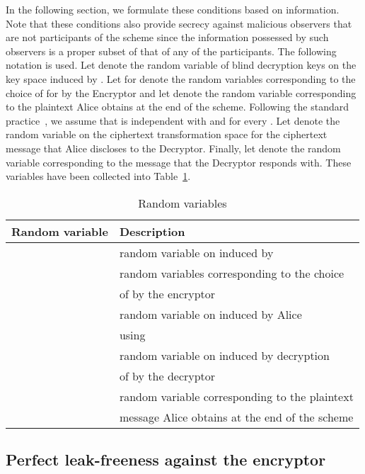 \documentclass[10pt,journal]{IEEEtran}
\begin{document}
In the following section, we formulate these conditions based on information. Note that these
conditions also provide secrecy against malicious observers that are not participants of the
scheme since the information possessed by such observers is a proper subset of that of any of the participants.
The following
notation is used.
Let 
denote the random variable of blind decryption keys on the key space 
induced by .
Let  for  denote
the random variables corresponding to the choice of  for 
by the Encryptor and let  denote the random variable corresponding to the plaintext 
Alice obtains at the end of the scheme. Following the standard practice~\cite{Katz_2007}, we assume that  is independent
with  and  for every .
Let  denote the random variable on the ciphertext transformation space 
for the ciphertext message  that Alice discloses to the Decryptor.
Finally, let  denote the random variable corresponding to the message 
that the Decryptor responds with. These variables have been collected into Table~\ref{tab:Table of random variables}.
\begin{table}
\caption{Random variables}
\begin{tabular}{|c|l|}
\hline
Random variable & Description\\
\hline
\hline
 & random variable on  induced by  \\
 & random variables corresponding to the choice\\ & of  by the encryptor\\
 & random variable on  induced by Alice\\ & using \\
 & random variable on  induced by decryption\\ & of  by the decryptor\\
 & random variable corresponding to the plaintext\\ &  message  Alice obtains at the end of the scheme\\
\hline
\end{tabular}
\vspace{4pt}
\label{tab:Table of random variables}
\end{table}



\subsection{Perfect leak-freeness against the encryptor}
\end{document}
